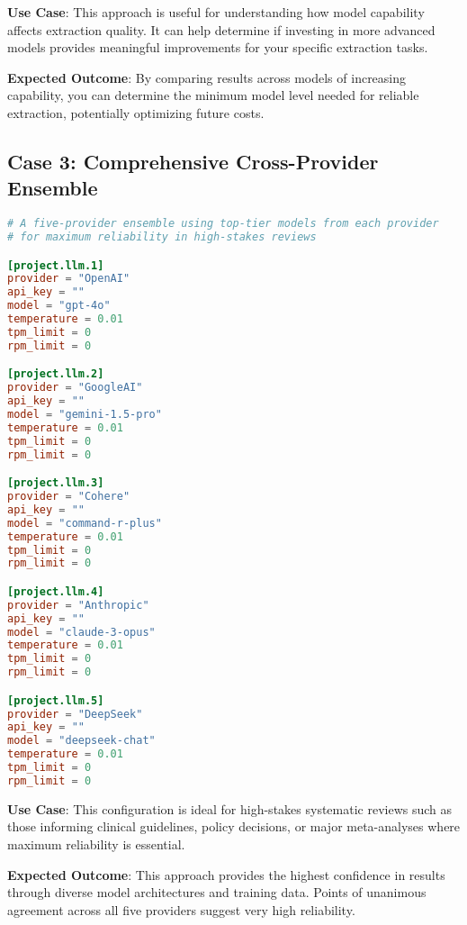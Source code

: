 \textbf{Use Case}: This approach is useful for understanding how model capability affects extraction quality. It can help determine if investing in more advanced models provides meaningful improvements for your specific extraction tasks.

\textbf{Expected Outcome}: By comparing results across models of increasing capability, you can determine the minimum model level needed for reliable extraction, potentially optimizing future costs.

\subsection{Case 3: Comprehensive Cross-Provider Ensemble}

\begin{configbox}
\begin{lstlisting}[language=TOML]
# A five-provider ensemble using top-tier models from each provider
# for maximum reliability in high-stakes reviews

[project.llm.1]
provider = "OpenAI"
api_key = ""
model = "gpt-4o"
temperature = 0.01
tpm_limit = 0
rpm_limit = 0

[project.llm.2]
provider = "GoogleAI"
api_key = ""
model = "gemini-1.5-pro"
temperature = 0.01
tpm_limit = 0
rpm_limit = 0

[project.llm.3]
provider = "Cohere"
api_key = ""
model = "command-r-plus"
temperature = 0.01
tpm_limit = 0
rpm_limit = 0

[project.llm.4]
provider = "Anthropic"
api_key = ""
model = "claude-3-opus"
temperature = 0.01
tpm_limit = 0
rpm_limit = 0

[project.llm.5]
provider = "DeepSeek"
api_key = ""
model = "deepseek-chat"
temperature = 0.01
tpm_limit = 0
rpm_limit = 0
\end{lstlisting}
\end{configbox}

\textbf{Use Case}: This configuration is ideal for high-stakes systematic reviews such as those informing clinical guidelines, policy decisions, or major meta-analyses where maximum reliability is essential.

\textbf{Expected Outcome}: This approach provides the highest confidence in results through diverse model architectures and training data. Points of unanimous agreement across all five providers suggest very high reliability.



